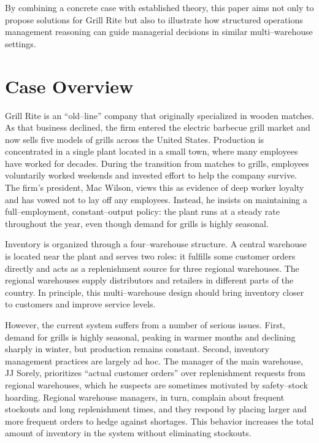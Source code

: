 \documentclass[12pt,a4paper]{article}
\begin{document}
By combining a concrete case with established theory, this paper aims not only to propose solutions for Grill Rite but also to illustrate how structured operations management reasoning can guide managerial decisions in similar multi–warehouse settings.

\section{Case Overview}
\label{sec:case_overview}

Grill Rite is an ``old–line'' company that originally specialized in wooden matches. As that business declined, the firm entered the electric barbecue grill market and now sells five models of grills across the United States. Production is concentrated in a single plant located in a small town, where many employees have worked for decades. During the transition from matches to grills, employees voluntarily worked weekends and invested effort to help the company survive. The firm’s president, Mac Wilson, views this as evidence of deep worker loyalty and has vowed not to lay off any employees. Instead, he insists on maintaining a full–employment, constant–output policy: the plant runs at a steady rate throughout the year, even though demand for grills is highly seasonal.

Inventory is organized through a four–warehouse structure. A central warehouse is located near the plant and serves two roles: it fulfills some customer orders directly and acts as a replenishment source for three regional warehouses. The regional warehouses supply distributors and retailers in different parts of the country. In principle, this multi–warehouse design should bring inventory closer to customers and improve service levels.

However, the current system suffers from a number of serious issues. First, demand for grills is highly seasonal, peaking in warmer months and declining sharply in winter, but production remains constant. Second, inventory management practices are largely ad hoc. The manager of the main warehouse, JJ Sorely, prioritizes ``actual customer orders'' over replenishment requests from regional warehouses, which he suspects are sometimes motivated by safety–stock hoarding. Regional warehouse managers, in turn, complain about frequent stockouts and long replenishment times, and they respond by placing larger and more frequent orders to hedge against shortages. This behavior increases the total amount of inventory in the system without eliminating stockouts.
\end{document}
